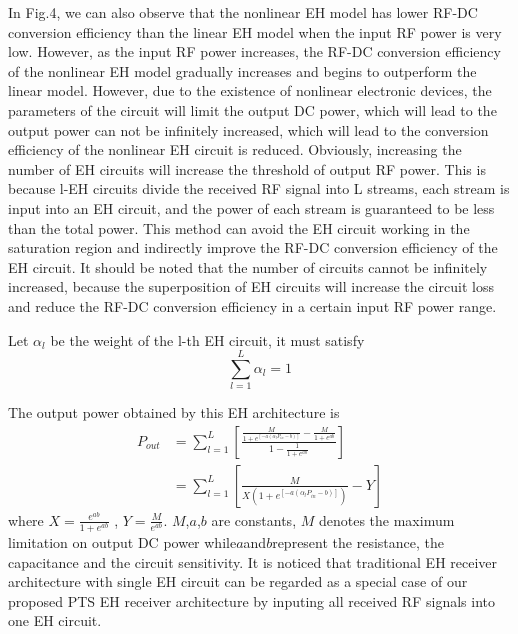 \documentclass[conference]{IEEEtran}
\begin{document}
In Fig.4, we can also observe that the nonlinear EH model has lower RF-DC conversion efficiency than the linear EH model when the input RF power is very low. However, as the input RF power increases, the RF-DC conversion efficiency of the nonlinear EH model gradually increases and begins to outperform the linear model. However, due to the existence of nonlinear electronic devices, the parameters of the circuit will limit the output DC power, which will lead to the output power can not be infinitely increased, which will lead to the conversion efficiency of the nonlinear EH circuit is reduced. Obviously, increasing the number of EH circuits will increase the threshold of output RF power. This is because l-EH circuits divide the received RF signal into L streams, each stream is input into an EH circuit, and the power of each stream is guaranteed to be less than the total power. This method can avoid the EH circuit working in the saturation region and indirectly improve the RF-DC conversion efficiency of the EH circuit. 
It should be noted that the number of circuits cannot be infinitely increased, because the superposition of EH circuits will increase the circuit loss and reduce the RF-DC conversion efficiency in a certain input RF power range.

Let $\alpha _{l} $ be the weight of the l-th EH circuit, it must satisfy
\begin{equation}\label{eqn-1}
{\textstyle \sum_{l=1}^{L}} \alpha _{l} = 1
\end{equation}

The output power obtained by this EH architecture is 
\begin{equation}\label{eqn-2}
  \begin{aligned}
	P_{out}^{} &= {\textstyle \sum_{l=1}^{L}} \left [ \frac{\frac{M}{1+e^{\left [ -a\left ( \alpha _{l} P_{in}-b  \right )  			\right ] } }- \frac{M}{1+e^{ab} }  }{1-\frac{1}{1+e^{ab} } }  \right ] \\ 
	&= {\textstyle \sum_{l=1}^{L}} \left [ \frac{M}{X\left ( 1+e^{\left [ -a\left ( \alpha _{l}  P_{in} -b\right )  \right ] }  	\right ) } -Y \right ]
  \end{aligned}
\end{equation}
where $X= \frac{e^{ab} }{1+e^{ab} }$ , $Y= \frac{M }{e^{ab} }$. $M$,$a$,$b$ are constants, $M$ denotes the maximum limitation on output DC power while$a$and$b$represent the resistance, the capacitance and the circuit sensitivity. It is noticed that traditional EH receiver architecture with single EH circuit can be regarded as a special case of our proposed PTS EH receiver architecture by inputing all received RF signals into one EH circuit.
\end{document}
